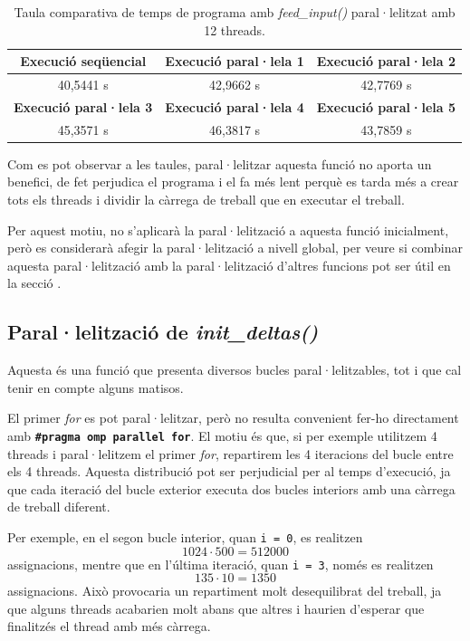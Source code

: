 \documentclass{article}
\begin{document}
\begin{table}[H]
    \centering
    \begin{tabular}{|c|c|c|}
        \hline
        \textbf{Execució seqüencial} & \textbf{Execució paral·lela 1} & \textbf{Execució paral·lela 2} \\ \hline
        40,5441 s & 42,9662 s & 42,7769 s \\ \hline
        \textbf{Execució paral·lela 3} & \textbf{Execució paral·lela 4} & \textbf{Execució paral·lela 5} \\ \hline
        45,3571 s & 46,3817 s & 43,7859 s \\ \hline
    \end{tabular}
    \caption{Taula comparativa de temps de programa amb \textit{feed\_input()} paral·lelitzat amb 12 threads.}
    \label{tab:f1_12trheads}
\end{table}

Com es pot observar a les taules, paral·lelitzar aquesta funció no aporta un benefici, de fet perjudica el programa i el fa més lent perquè es tarda més a crear tots els threads i dividir la càrrega de treball que en executar el treball.

Per aquest motiu, no s'aplicarà la paral·lelització a aquesta funció inicialment, però es considerarà afegir la paral·lelització a nivell global, per veure si combinar aquesta paral·lelització amb la paral·lelització d'altres funcions pot ser útil en la secció \texttt{}.

\subsection{Paral·lelització de \textit{init\_deltas()}}

Aquesta és una funció que presenta diversos bucles paral·lelitzables, tot i que cal tenir en compte alguns matisos.

El primer \textit{for} es pot paral·lelitzar, però no resulta convenient fer-ho directament amb \textbf{\texttt{\#pragma omp parallel for}}. El motiu és que, si per exemple utilitzem 4 threads i paral·lelitzem el primer \textit{for}, repartirem les 4 iteracions del bucle entre els 4 threads. Aquesta distribució pot ser perjudicial per al temps d'execució, ja que cada iteració del bucle exterior executa dos bucles interiors amb una càrrega de treball diferent.

Per exemple, en el segon bucle interior, quan
\texttt{i = 0}, es realitzen
\[
1024 \cdot 500 = 512000
\]
assignacions, mentre que en l'última iteració,
quan \texttt{i = 3}, només es realitzen
\[
135 \cdot 10 = 1350
\]
assignacions.
Això provocaria un repartiment molt desequilibrat del treball,
ja que alguns threads acabarien molt abans que altres i
haurien d'esperar que finalitzés el thread amb més càrrega.
\end{document}
